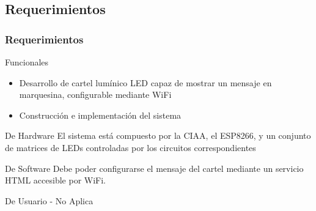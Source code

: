 \subsection{Requerimientos}
\begin{frame}
	\frametitle{Requerimientos}
	\begin{block}{Funcionales}
			\begin{itemize}
			\item Desarrollo de cartel lumínico LED capaz de mostrar un mensaje en marquesina, configurable mediante WiFi
			\item Construcción e implementación del sistema
				\end{itemize}	
		
		\end{block}

	\begin{block}{De Hardware}
El sistema está compuesto por la CIAA, el ESP8266, y un conjunto de matrices de LEDs controladas por los circuitos correspondientes
\end{block}

	\begin{block}{De Software}
 Debe poder configurarse el mensaje del cartel mediante un servicio HTML accesible por WiFi.

\end{block}

	\begin{block}{De Usuario - No Aplica}
	\end{block}
\end{frame}
	



